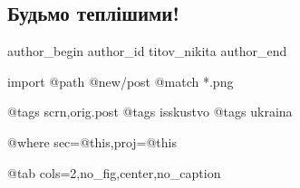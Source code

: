  
 
 
 
 
 
\subsection{Будьмо теплішими!}
\label{sec:17_11_2022.fb.titov_nikita.1.budjmo_teplishymy}
 
\ifcmt
 author_begin
   author_id titov_nikita
 author_end
\fi

\ifcmt
  import
    @path @new/post
    @match *.png
  
    @tags scrn,orig.post
    @tags isskustvo
    @tags ukraina

    @where sec=@this,proj=@this
  
    @tab cols=2,no_fig,center,no_caption
\fi
